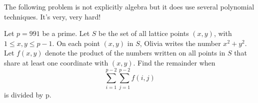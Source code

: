 \documentclass[mast]{lucky}
\begin{document}
\begin{remark}
The following problem is not explicitly algebra but it does use several polynomial techniques. It\rq{}s very, very hard!
\end{remark}

\begin{prob}{21}
Let $p = 991$ be a prime. Let $S$ be the set of all lattice points $(x, y)$,
with $1 \leq x, y \leq p - 1$. On each point $(x, y)$ in $S$, Olivia writes the number $x^2 + y^2$. Let
$f(x, y)$ denote the product of the numbers written on all points in $S$ that share at least
one coordinate with $(x, y)$. Find the remainder when
$$\sum_{i=1}^{p-2} \sum_{j=1}^{p-2} f(i,j)$$
is divided by p.
\end{prob}
\end{document}
